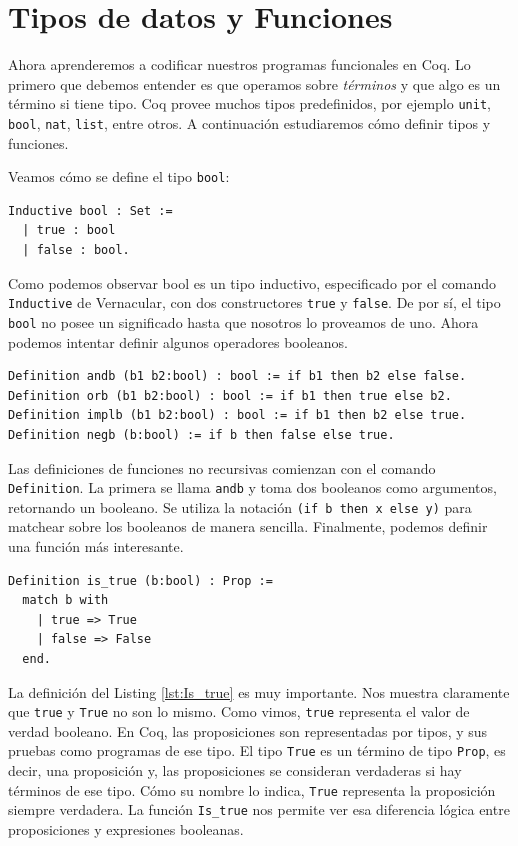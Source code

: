 \section{Tipos de datos y Funciones}

Ahora aprenderemos a codificar nuestros programas funcionales en Coq. Lo primero que debemos entender es que operamos sobre \textit{términos} y que algo es un término si tiene tipo. Coq provee muchos tipos predefinidos, por ejemplo \lstinline{unit}, \lstinline{bool}, \lstinline{nat}, \lstinline{list}, entre otros. A continuación estudiaremos cómo definir tipos y funciones.

Veamos cómo se define el tipo \lstinline{bool}:

\begin{lstlisting}
Inductive bool : Set :=
  | true : bool
  | false : bool.
\end{lstlisting}

Como podemos observar bool es un tipo inductivo, especificado por el comando \lstinline{Inductive} de Vernacular, con dos constructores \lstinline{true} y \lstinline{false}. De por sí, el tipo \lstinline{bool} no posee un significado hasta que nosotros lo proveamos de uno. Ahora podemos intentar definir algunos operadores booleanos.
\begin{lstlisting}
Definition andb (b1 b2:bool) : bool := if b1 then b2 else false.
Definition orb (b1 b2:bool) : bool := if b1 then true else b2.
Definition implb (b1 b2:bool) : bool := if b1 then b2 else true.
Definition negb (b:bool) := if b then false else true.
\end{lstlisting}

Las definiciones de funciones no recursivas comienzan con el comando \lstinline{Definition}. La primera se llama \lstinline{andb} y toma dos booleanos como argumentos, retornando un booleano. Se utiliza la notación \lstinline{(if b then x else y)} para matchear sobre los booleanos de manera sencilla. Finalmente, podemos definir una función más interesante.

\begin{lstlisting}[frame=tb,caption={Definición de \lstinline{is_true}},label=lst:Is_true]
Definition is_true (b:bool) : Prop :=
  match b with
    | true => True
    | false => False
  end.
\end{lstlisting}

La definición del Listing \ref{lst:Is_true} es muy importante. Nos muestra claramente que \lstinline{true} y \lstinline{True} no son lo mismo.
Como vimos, \lstinline{true} representa el valor de verdad booleano.
En Coq, las proposiciones son representadas por tipos, y sus pruebas como programas de ese tipo.
El tipo \lstinline{True} es un término de tipo \lstinline{Prop}, es decir, una proposición y, las proposiciones se consideran verdaderas si hay términos de ese tipo. Cómo su nombre lo indica, \lstinline{True} representa la proposición siempre verdadera.
La función \lstinline{Is_true} nos permite ver esa diferencia lógica entre proposiciones y expresiones booleanas. 

